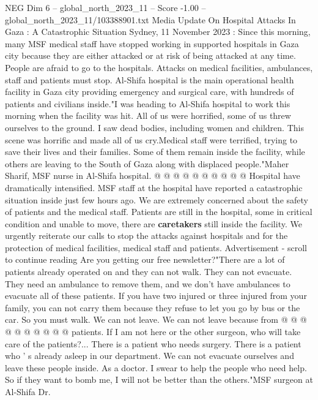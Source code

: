 \begin{textsample}{NEG Dim 6 – global\_north\_2023\_11 – Score -1.00 – global\_north\_2023\_11/103388901.txt}  \label{ex:f6_neg_205}
Media Update On Hospital Attacks In Gaza : A Catastrophic Situation Sydney, 11 November 2023 : Since this morning, many MSF medical staff have stopped working in supported hospitals in Gaza city because they are either attacked or at risk of being attacked at any time.
People are afraid to go to the hospitals.
Attacks on medical facilities, ambulances, staff and patients must stop.
Al-Shifa hospital is the main operational health facility in Gaza city providing emergency and surgical care, with hundreds of patients and civilians inside."I was heading to Al-Shifa hospital to work this morning when the facility was hit.
All of us were horrified, some of us threw ourselves to the ground.
I saw dead bodies, including women and children.
This scene was horrific and made all of us cry.Medical staff were terrified, trying to save their lives and their families.
Some of them remain inside the facility, while others are leaving to the South of Gaza along with displaced people."Maher Sharif, MSF nurse in Al-Shifa hospital. @ @ @ @ @ @ @ @ @ @ Hospital have dramatically intensified.
MSF staff at the hospital have reported a catastrophic situation inside just few hours ago.
We are extremely concerned about the safety of patients and the medical staff.
Patients are still in the hospital, some in critical condition and unable to move, there are \textbf{caretakers} still inside the facility.
We urgently reiterate our calls to stop the attacks against hospitals and for the protection of medical facilities, medical staff and patients.
Advertisement - scroll to continue reading Are you getting our free newsletter?"There are a lot of patients already operated on and they can not walk.
They can not evacuate.
They need an ambulance to remove them, and we don't have ambulances to evacuate all of these patients.
If you have two injured or three injured from your family, you can not carry them because they refuse to let you go by bus or the car.
So you must walk.
We can not leave.
We can not leave because from @ @ @ @ @ @ @ @ @ @ patients.
If I am not here or the other surgeon, who will take care of the patients?...
There is a patient who needs surgery.
There is a patient who ' s already asleep in our department.
We can not evacuate ourselves and leave these people inside.
As a doctor.
I swear to help the people who need help.
So if they want to bomb me, I will not be better than the others."MSF surgeon at Al-Shifa Dr.

\end{textsample}
